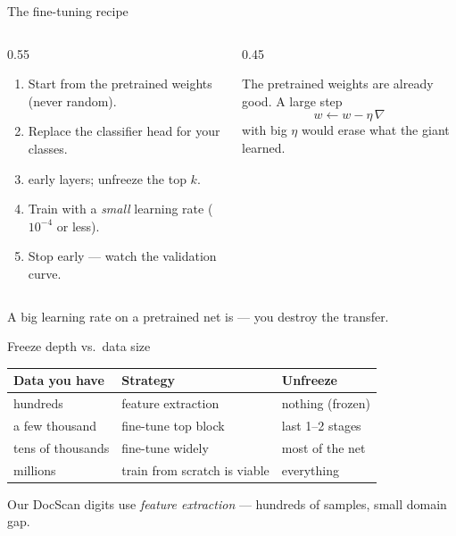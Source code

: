 \documentclass[10pt,aspectratio=169]{beamer}
\begin{document}
\begin{frame}{The fine-tuning recipe}
  \begin{columns}[T]
    \begin{column}{0.55\textwidth}
      \begin{enumerate}
        \item Start from the pretrained weights (never random).
        \item Replace the classifier head for your classes.
        \item {} early layers; unfreeze the top $k$.
        \item Train with a \emph{small} learning rate ($10^{-4}$ or less).
        \item Stop early — watch the validation curve.
      \end{enumerate}
    \end{column}
    \begin{column}{0.45\textwidth}
      \begin{mathbox}
        The pretrained weights are already good. A large step
        \[ w \leftarrow w - \eta\,\nabla \]
        with big $\eta$ would erase what the giant learned.
      \end{mathbox}
    \end{column}
  \end{columns}
  \begin{badbox}
    A big learning rate on a pretrained net is  — you destroy the transfer.
  \end{badbox}
\end{frame}

\begin{frame}{Freeze depth vs.\ data size}
  \begin{center}
  \begin{tabular}{@{}lll@{}}
    \toprule
    \textbf{Data you have} & \textbf{Strategy} & \textbf{Unfreeze} \\
    \midrule
    hundreds & feature extraction & nothing (frozen) \\
    a few thousand & fine-tune top block & last 1--2 stages \\
    tens of thousands & fine-tune widely & most of the net \\
    millions & train from scratch is viable & everything \\
    \bottomrule
  \end{tabular}
  \end{center}
  \begin{goodbox}
    Our DocScan digits use \emph{feature extraction} — hundreds of samples, small domain gap.
  \end{goodbox}
\end{frame}
\end{document}
